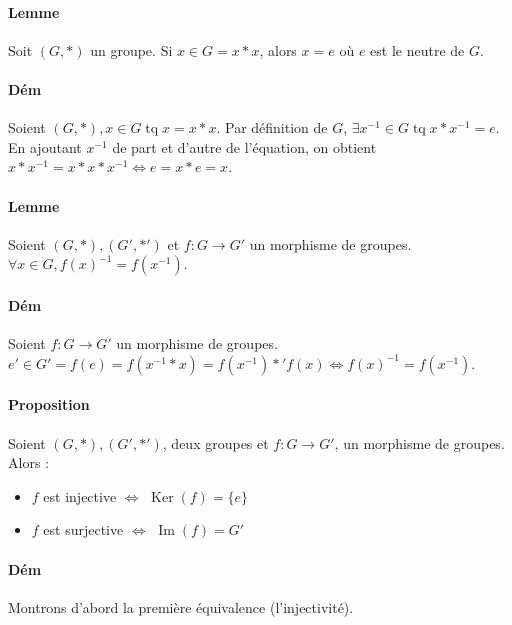 \documentclass{article}
\DeclareMathOperator{\tq}{\text{ tq }}
\DeclareMathOperator{\Imappl}{Im}
\DeclareMathOperator{\Ker}{Ker}
\begin{document}
			\paragraph{Lemme} Soit $(G, *)$ un groupe. Si $x \in G = x * x$, alors $x = e$ où $e$ est le neutre de $G$.

			\paragraph{Dém} Soient $(G, *), x \in G \tq x = x * x$. Par définition de $G$, $\exists x^{-1} \in G \tq x * x^{-1} = e$.
			En ajoutant $x^{-1}$ de part et d'autre de l'équation, on obtient $x * x^{-1} = x * x * x^{-1} \iff e = x * e = x$.

			\paragraph{Lemme} Soient $(G, *), (G', *')$ et $f : G \to G'$ un morphisme de groupes. $\forall x \in G, f(x)^{-1} = f(x^{-1})$.

			\paragraph{Dém} Soient $f : G \to G'$ un morphisme de groupes. $e' \in G' = f(e) = f(x^{-1} * x) = f(x^{-1}) *' f(x) \iff
			f(x)^{-1} = f(x^{-1})$.

			\paragraph{Proposition} Soient $(G, *), (G', *')$, deux groupes et $f : G \to G'$, un morphisme de groupes. Alors :

			\begin{itemize}
				\item $f$ est injective $\iff$ $\Ker(f) = \{e\}$
				\item $f$ est surjective $\iff$ $\Imappl(f) = G'$
			\end{itemize}

			\paragraph{Dém} Montrons d'abord la première équivalence (l'injectivité).
\end{document}
